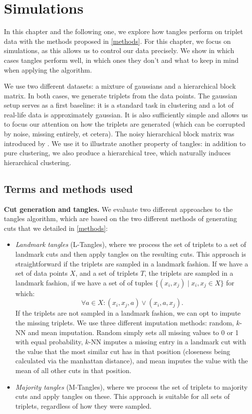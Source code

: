\chapter{Simulations}\label{simulations}
In this chapter and the following one, we explore how tangles perform on triplet data with the methods proposed in \autoref{methods}. 
For this chapter, we focus on simulations, as this allows us to control our data precisely.  
We show in which cases tangles perform well, in which ones they don't and what to keep in mind when applying the algorithm. 

We use two different datasets: a mixture of gaussians and a hierarchical block matrix. In both cases, we generate triplets from the data points.
The gaussian setup serves as a first baseline: it is a standard task in clustering and a lot of real-life data is approximately gaussian. 
It is also sufficiently simple and allows us to focus our attention on how the triplets are generated (which can be corrupted by noise, missing entirely, et cetera). 
The noisy hierarchical block matrix was introduced by \cite{balakrishnanNoiseThresholdsSpectral2011}.
We use it to illustrate another property of tangles: in addition to pure clustering, we also produce a hierarchical tree, 
which naturally induces hierarchical clustering. 

\section{Terms and methods used}\label{sims-methods}
\textbf{Cut generation and tangles.} We evaluate two different approaches to the tangles algorithm, which are based on the two different methods of generating cuts 
that we detailed in \autoref{methods}:
\begin{itemize}
    \item \textit{Landmark tangles} (L-Tangles), where we process the set of triplets to a set of landmark cuts and then apply tangles on the resulting cuts.
This approach is straightforward if the triplets are sampled in a landmark fashion. If we have a set of data points $X$, and a set of triplets $T$,
the triplets are sampled in a landmark fashion, if we have a set of of tuples $\{ (x_i, x_j)  \mid  x_i, x_j \in X \}$ for which: 
\[
\forall a \in X: (x_i, x_j, a) \vee (x_i, a, x_j)
.\] 
If the triplets are not sampled in a landmark fashion, we can opt to impute the missing triplets. We use three different imputation methods: random, $k$-NN and mean imputation.
Random simply sets all missing values to 0 or 1 with equal probability, $k$-NN imputes
a missing entry in a landmark cut with the value that the most similar cut has in that position (closeness being calculated via the manhattan distance), and mean 
imputes the value with the mean of all other cuts in that position. 

\item
\textit{Majority tangles} (M-Tangles), where we process the set of triplets to majority cuts and apply tangles on these. 
This approach is suitable for all sets of triplets, regardless of how they were sampled.
\end{itemize}

